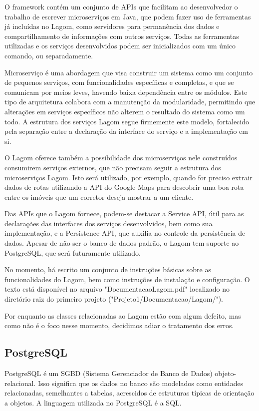 \documentclass[a4paper,11pt,fleqn]{article}
\begin{document}
O framework contém um conjunto de APIs que facilitam ao desenvolvedor o trabalho de escrever microserviços em Java, que
 podem fazer uso de ferramentas já incluídas no Lagom, como servidores para permanência dos dados e compartilhamento de informações
  com outros serviços. Todas as ferramentas utilizadas e os serviços desenvolvidos podem ser inicializados com um único
   comando, ou separadamente.

Microserviço é uma abordagem que visa construir um sistema como um conjunto de pequenos serviços, com funcionalidades
 específicas e completas, e que se comunicam por meios leves, havendo baixa dependência entre os módulos. Este tipo
  de arquitetura colabora com a manutenção da modularidade, permitindo que alterações em serviços específicos não alterem o resultado
   do sistema como um todo. A estrutura dos serviços Lagom segue firmemente este modelo, fortalecido pela separação entre a declaração da interface do
    serviço e a implementação em si.

O Lagom oferece também a possibilidade dos microserviços nele construídos consumirem serviços externos, que não
 precisam seguir a estrutura dos microserviços Lagom. Isto será utilizado, por exemplo, quando for preciso extrair dados de rotas utilizando a API do Google Maps
  para descobrir uma boa rota entre os imóveis que um corretor deseja mostrar a um cliente.

Das APIs que o Lagom fornece, podem-se destacar a Service API, útil para as declarações das interfaces dos serviços desenvolvidos, bem como sua
 implementação, e a Persistence API, que auxilia no controle da persistência de dados. Apesar de não ser o banco de dados padrão, o Lagom
  tem suporte ao PostgreSQL, que será futuramente utilizado.

No momento, há escrito um conjunto de instruções básicas sobre as funcionalidades do Lagom, bem como instruções de instalação e configuração.
 O texto está disponível no arquivo "DocumentacaoLagom.pdf" localizado no diretório raiz do primeiro projeto ("Projeto1/Documentacao/Lagom/").

Por enquanto as classes relacionadas ao Lagom estão com algum defeito, mas como não é o foco nesse momento, decidimos adiar o tratamento dos erros.

\subsection{PostgreSQL}
\label{ss:postgre}

PostgreSQL é um SGBD (Sistema Gerenciador de Banco de Dados) objeto-relacional. Isso significa que os dados no banco são modelados como entidades relacionadas, semelhantes
 a tabelas, acrescidos de estruturas típicas de orientação a objetos. A linguagem utilizada no PostgreSQL é a SQL.
\end{document}
